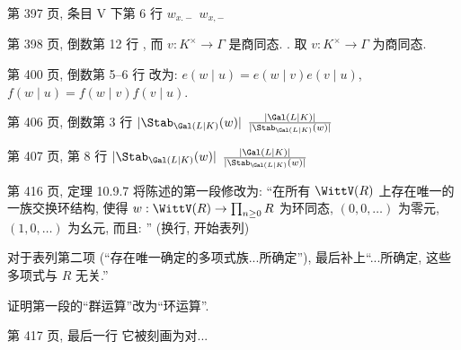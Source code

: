 \documentclass{AJerrata}
\begin{document}
\begin{Errata}

        \item[第 397 页, 条目 V 下第 6 行]
        \Orig $w_{x.-}$
        \Corr $w_{x,-}$

        \item[第 398 页, 倒数第 12 行]
        \Orig \; , 而 $v: K^\times \to \Gamma$ 是商同态.
        \Corr \; . 取 $v: K^\times \to \Gamma$ 为商同态.
        
        \item[第 400 页, 倒数第 5--6 行]
		改为: $e(w \mid u) = e(w \mid v) e(v \mid u)$, $f(w \mid u) = f(w \mid v) f(v \mid u)$.

		\item[第 406 页, 倒数第 3 行]
		\Orig $|\Stab_{\Gal(L|K)}(w)|$
		\Corr $\frac{|\Gal(L|K)|}{|\Stab_{\Gal(L|K)}(w)|}$
		
		\item[第 407 页, 第 8 行]
		\Orig $|\Stab_{\Gal(L|K)}(w)|$
		\Corr $\frac{|\Gal(L|K)|}{|\Stab_{\Gal(L|K)}(w)|}$

        \item[第 416 页, 定理 10.9.7]
        将陈述的第一段修改为: ``在所有 $\WittV(R)$ 上存在唯一的一族交换环结构, 使得 $w: \WittV(R) \to \prod_{n \geq 0} R$ 为环同态, $(0, 0, \ldots)$ 为零元, $(1, 0, \ldots)$ 为幺元, 而且: '' (换行, 开始表列)
        
        对于表列第二项 (``存在唯一确定的多项式族...所确定''), 最后补上``...所确定, 这些多项式与 $R$ 无关.''
        
        证明第一段的``群运算''改为``环运算''.

        \item[第 417 页, 最后一行] 它被刻画为对...
	\end{Errata}
\end{document}
